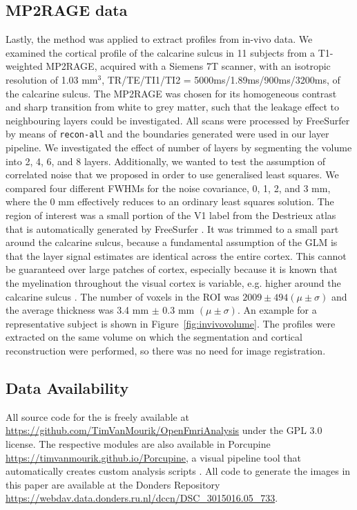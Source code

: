 \subsection{MP2RAGE data}
Lastly, the method was applied to extract profiles from in-vivo data. We examined the cortical profile of the calcarine sulcus in 11 subjects from a T1-weighted MP2RAGE, acquired with a Siemens 7T scanner, with an isotropic resolution of 1.03 mm$^3$, TR/TE/TI1/TI2 = 5000ms/1.89ms/900ms/3200ms, of the calcarine sulcus. The MP2RAGE was chosen for its homogeneous contrast and sharp transition from white to grey matter, such that the leakage effect to neighbouring layers could be investigated. All scans were processed by FreeSurfer \cite{Dale1999} by means of \texttt{recon-all} and the boundaries generated were used in our layer pipeline. We investigated the effect of number of layers by segmenting the volume into 2, 4, 6, and 8 layers. Additionally, we wanted to test the assumption of correlated noise that we proposed in order to use generalised least squares. We compared four different FWHMs for the noise covariance, 0, 1, 2, and 3 mm, where the 0 mm effectively reduces to an ordinary least squares solution. The region of interest was a small portion of the V1 label from the Destrieux atlas that is automatically generated by FreeSurfer \cite{Fischl2004}. It was trimmed to a small part around the calcarine sulcus, because a fundamental assumption of the GLM is that the layer signal estimates are identical across the entire cortex. This cannot be guaranteed over large patches of cortex, especially because it is known that the myelination throughout the visual cortex is variable, e.g. higher around the calcarine sulcus \cite{Bridge2005}. The number of voxels in the ROI was $2009 \pm 494 (\mu \pm \sigma)$ and the average thickness was 3.4 mm $\pm$ 0.3 mm $(\mu \pm \sigma)$. An example for a representative subject is shown in Figure~\ref{fig:invivovolume}. The profiles were extracted on the same volume on which the segmentation and cortical reconstruction were performed, so there was no need for image registration.


\subsection*{Data Availability}
All source code for the  is freely available at \url{https://github.com/TimVanMourik/OpenFmriAnalysis} under the GPL 3.0 license. The respective modules are also available in Porcupine \url{https://timvanmourik.github.io/Porcupine}, a visual pipeline tool that automatically creates custom analysis scripts \cite{VanMourik2017}. All code to generate the images in this paper are available at the Donders Repository \url{https://webdav.data.donders.ru.nl/dccn/DSC_3015016.05_733}.

